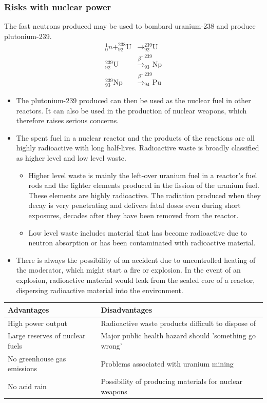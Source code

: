 \subsubsection*{Risks with nuclear power}
The fast neutrons produced may be used to bombard uranium-238 and produce plutonium-239.
\[
\begin{aligned}
^1_0n + ^{238}_{92}\text{U} &\rightarrow ^{239}_{92}\text{U}\\
^{239}_{92}\text{U} &\xrightarrow{\beta^-} ^{239}_{93}\text{Np}\\
^{239}_{93}\text{Np} &\xrightarrow{\beta^-} ^{239}_{94}\text{Pu}
\end{aligned}\]
\begin{itemize}
  \item The plutonium-239 produced can then be used as the nuclear fuel in other reactors. It can also be used in the production of nuclear weapons, which therefore raises serious concerns.
  \item The spent fuel in a nuclear reactor and the products of the reactions are all highly radioactive with long half-lives. Radioactive waste is broadly classified as higher level and low level waste.
  \begin{itemize}
    \item Higher level waste is mainly the left-over uranium fuel in a reactor's fuel rods and the lighter elements produced in the fission of the uranium fuel. These elements are highly radioactive. The radiation produced when they decay is very penetrating and delivers fatal doses even during short exposures, decades after they have been removed from the reactor.
    \item Low level waste includes material that has become radioactive due to neutron absorption or has been contaminated with radioactive material. 
  \end{itemize}
  \item There is always the possibility of an accident due to uncontrolled heating of the moderator, which might start a fire or explosion. In the event of an explosion, radioactive material would leak from the sealed core of a reactor, dispersing radioactive material into the environment.
\end{itemize}
\begin{center}
\begin{tabularx}{\textwidth}{@{}|Y |Y |@{}}
\toprule
\textbf{Advantages} & \textbf{Disadvantages}\\
\midrule
High power output & Radioactive waste products difficult to dispose of\\
\midrule
Large reserves of nuclear fuels & Major public health hazard should 'something go wrong'\\
\midrule
No greenhouse gas emissions & Problems associated with uranium mining\\
\midrule
No acid rain & Possibility of producing materials for nuclear weapons\\
\bottomrule
\end{tabularx}
\end{center}
